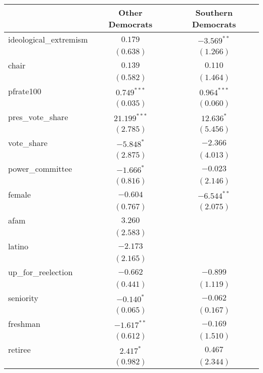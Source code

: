 \documentclass[12pt]{article}
\begin{document}
\begin{table}
	\begin{center}
		\begin{tabular}{l c c }
			\hline
			& Other Democrats & Southern Democrats \\
			\hline
			ideological\_extremism & $0.179$        & $-3.569^{**}$ \\
			& $(0.638)$      & $(1.266)$     \\
			chair                  & $0.139$        & $0.110$       \\
			& $(0.582)$      & $(1.464)$     \\
			pfrate100              & $0.749^{***}$  & $0.964^{***}$ \\
			& $(0.035)$      & $(0.060)$     \\
			pres\_vote\_share      & $21.199^{***}$ & $12.636^{*}$  \\
			& $(2.785)$      & $(5.456)$     \\
			vote\_share            & $-5.848^{*}$   & $-2.366$      \\
			& $(2.875)$      & $(4.013)$     \\
			power\_committee       & $-1.666^{*}$   & $-0.023$      \\
			& $(0.816)$      & $(2.146)$     \\
			female                 & $-0.604$       & $-6.544^{**}$ \\
			& $(0.767)$      & $(2.075)$     \\
			afam                   & $3.260$        &               \\
			& $(2.583)$      &               \\
			latino                 & $-2.173$       &               \\
			& $(2.165)$      &               \\
			up\_for\_reelection    & $-0.662$       & $-0.899$      \\
			& $(0.441)$      & $(1.119)$     \\
			seniority              & $-0.140^{*}$   & $-0.062$      \\
			& $(0.065)$      & $(0.167)$     \\
			freshman               & $-1.617^{**}$  & $-0.169$      \\
			& $(0.612)$      & $(1.510)$     \\
			retiree                & $2.417^{*}$    & $0.467$       \\
			& $(0.982)$      & $(2.344)$     \\

\end{tabular}
\end{center}
\end{table}
\end{document}
